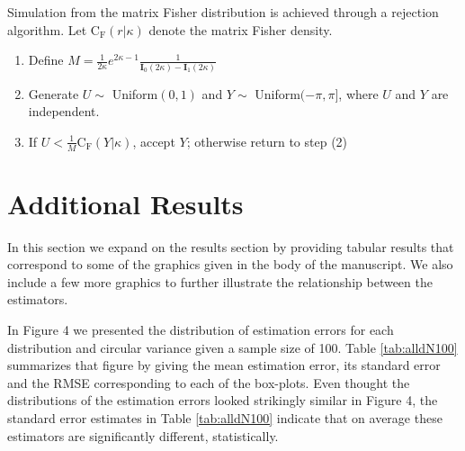 \documentclass[12pt]{article}
\begin{document}
Simulation from the matrix Fisher distribution is achieved through a rejection algorithm.  Let  $\mathrm{C_F}(r|\kappa)$ denote the matrix Fisher density.%

\begin{enumerate}
\item Define $M=\frac{1}{2\kappa}e^{2\kappa - 1}\frac{1}{\mathbf{I}_0(2\kappa)-\mathbf{I}_1(2\kappa)}$
\item Generate $U\sim$ Uniform$(0,1)$ and $Y\sim$ Uniform$(-\pi,\pi]$, where $U$ and $Y$ are independent.
\item If $U<\frac{1}{M}\mathrm{C_F}(Y|\kappa)$, accept $Y$; otherwise return to step (2)
\end{enumerate}

%


\section{Additional Results}
\label{sec:appendix3}
In this section we expand on the results section by providing tabular results that correspond to some of the graphics given in the body of the manuscript.  We also include a few more graphics to further illustrate the relationship between the estimators.

In Figure 4 we presented the distribution of estimation errors for each distribution and circular variance given a sample size of 100.  Table \ref{tab:alldN100} summarizes that figure by giving the mean estimation error, its standard error and the RMSE corresponding to each of the box-plots.  Even thought the distributions of the estimation errors looked strikingly similar in Figure 4, the standard error estimates in Table \ref{tab:alldN100} indicate that on average these estimators are significantly different, statistically.  
\end{document}
